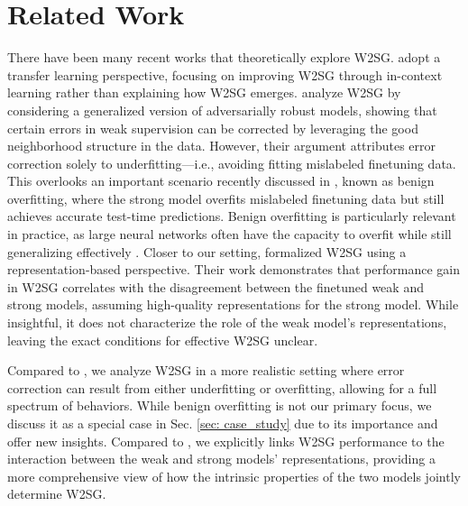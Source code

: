 \section{Related Work}
There have been many recent works that theoretically explore W2SG. \citet{somerstep2024statistical} adopt a transfer learning perspective, focusing on improving W2SG through in-context learning rather than explaining how W2SG emerges. \citet{lang2024theoretical,shin2024weak} analyze W2SG by considering a generalized version of adversarially robust models, showing that certain errors in weak supervision can be corrected by leveraging the good neighborhood structure in the data. However, their argument attributes error correction solely to underfitting—i.e., avoiding fitting mislabeled finetuning data.  This overlooks an important scenario recently discussed in \cite{wu2024provable}, known as benign overfitting, where the strong model overfits mislabeled finetuning data but still achieves accurate test-time predictions. Benign overfitting is particularly relevant in practice, as large neural networks often have the capacity to overfit while still generalizing effectively \cite{zhang2021understanding}. Closer to our setting, \citet{charikar2024quantifying} formalized W2SG using a representation-based perspective. %
Their work demonstrates that performance gain in W2SG correlates with the disagreement between the finetuned weak and strong models, assuming high-quality representations for the strong model. While insightful, it does not characterize the role of the weak model's representations, leaving the exact conditions for effective W2SG unclear.

Compared to \cite{lang2024theoretical}, we analyze W2SG in a more realistic setting where error correction can result from either underfitting or overfitting, allowing for a full spectrum of behaviors. While benign overfitting is not our primary focus, we discuss it as a special case in Sec. \ref{sec: case_study} due to its importance and offer new insights. Compared to \cite{charikar2024quantifying}, we explicitly links W2SG performance to the interaction between the weak and strong models' representations, providing a more comprehensive view of how the intrinsic properties of the two models jointly determine W2SG.


